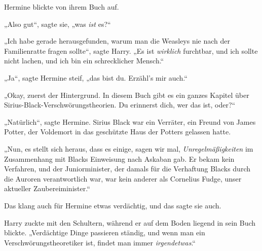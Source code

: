 Hermine blickte von ihrem Buch auf.

„Also gut“, sagte sie, „was \emph{ist} es?“

„Ich habe gerade herausgefunden, warum man die Weasleys nie nach der Familienratte fragen sollte“, sagte Harry.
„Es ist \emph{wirklich} furchtbar, und ich sollte nicht lachen, und ich bin ein schrecklicher Mensch.“

„Ja“, sagte Hermine steif, „das bist du. Erzähl’s mir auch.“

„Okay, zuerst der Hintergrund. In diesem Buch gibt es ein ganzes Kapitel über Sirius-Black-Verschwörungstheorien. Du erinnerst dich, wer das ist, oder?“

„Natürlich“, sagte Hermine. Sirius Black war ein Verräter, ein Freund von James Potter, der Voldemort in das geschützte Haus der Potters gelassen hatte.

„Nun, es stellt sich heraus, dass es einige, sagen wir mal, \emph{Unregelmäßigkeiten} im Zusammenhang mit Blacks Einweisung nach Askaban gab. Er bekam kein Verfahren, und der Juniorminister, der damals für die Verhaftung Blacks durch die Auroren verantwortlich war, war kein anderer als Cornelius Fudge, unser aktueller Zaubereiminister.“

Das klang auch für Hermine etwas verdächtig, und das sagte sie auch.

Harry zuckte mit den Schultern, während er auf dem Boden liegend in sein Buch blickte.
„Verdächtige Dinge passieren ständig, und wenn man ein Verschwörungstheoretiker ist, findet man immer \emph{irgendetwas}.“

